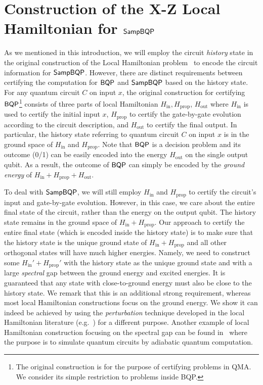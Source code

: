 \section{Construction of the X-Z Local Hamiltonian for $\operatorname{\mathsf{SampBQP}}$}
\label{sec:Hamiltonian}


\def \Hin {H_{\mathrm{in}}}
\def \Hout {H_{\mathrm{out}}}
\def \Hprop {H_{\mathrm{prop}}}
\def \Hclock {H_{\mathrm{clock}}}
\newcommand{\histpsi}[1]{\ket{\psi_{#1}^{\mathrm{hist}}}}
\newcommand{\LHXZ}[1]{\mathrm{LH}_{\mathrm{XZ}}^{#1}}

As we mentioned in this introduction, we will employ the circuit \emph{history} state in the original construction of the Local Hamiltonian problem~\cite{kitaev2002classical} to encode the circuit information for $\operatorname{\mathsf{SampBQP}}$. 
However, there are distinct requirements between certifying the computation for $\operatorname{\mathsf{BQP}}$ and $\operatorname{\mathsf{SampBQP}}$ based on the history state.
For any quantum circuit $C$ on input $x$, the original construction for certifying $\operatorname{\mathsf{BQP}}$\footnote{The original construction is for the purpose of certifying problems in QMA. We consider its simple restriction to problems inside BQP.} consists of three parts of local Hamiltonian $\Hin, \Hprop$, $\Hout$ where $\Hin$ is used to certify the initial input $x$, $\Hprop$ to certify the gate-by-gate evolution according to the circuit description, and $\Hout$ to certify the final output. 
In particular, the history state referring to quantum circuit $C$ on input $x$ is in the ground space of $\Hin$ and $\Hprop$. Note that $\operatorname{\mathsf{BQP}}$ is a decision problem and its outcome (0/1) can be easily encoded into the energy $\Hout$ on the single output qubit. 
As a result, the outcome of $\operatorname{\mathsf{BQP}}$ can simply be encoded by the \emph{ground energy} of $\Hin + \Hprop + \Hout$. 

To deal with $\operatorname{\mathsf{SampBQP}}$, we will still employ $\Hin$ and $\Hprop$ to certify the circuit's input and gate-by-gate evolution. However, in this case, we care about the entire final state of the circuit, rather than the energy on the output qubit. The history state remains in the ground space of $\Hin + \Hprop$.  
Our approach to certify the entire final state (which is encoded inside the history state) is to make sure that the history state is the unique ground state of $\Hin + \Hprop$ and all other orthogonal states will have much higher energies. 
Namely, we need to construct some $\Hin'+ \Hprop'$ with the history state as the unique ground state and with a large \emph{spectral} gap between the ground energy and excited energies. 
It is guaranteed that any state with close-to-ground energy must also be close to the history state. 
We remark that this is an additional strong requirement, whereas most local Hamiltonian constructions focus on the ground energy. 
We show it can indeed be achieved by using the \emph{perturbation} technique 
developed in the local Hamiltonian literature (e.g.~\cite{kempe_kitaev_regev_2006}) for a different purpose. 
Another example of local Hamiltonian construction focusing on the spectral gap can be found in~\cite{adiabatic} where the purpose is to simulate quantum circuits by adiabatic quantum computation. 


